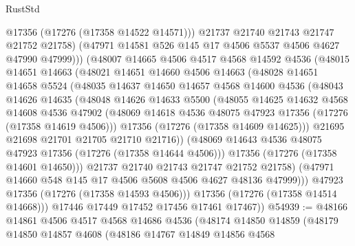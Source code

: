 \begin{lexlean}{RustStd}
\begin{coremodule}
                  @17356
                  (@17276 (@17358 @14522 @14571)))
                @21737
                @21740
                @21743
                @21747
                @21752
                @21758)
              (@47971 @14581 @526 @145 @17 @4506 @5537 @4506 @4627 @47990 @47999)))
          (@48007
            @14665
            @4506
            @4517
            @4568
            @14592
            @4536
            (@48015
              @14651
              @14663
              (@48021
                @14651
                @14660
                @4506
                @14663
                (@48028
                  @14651
                  @14658
                  @5524
                  (@48035
                    @14637
                    @14650
                    @14657
                    @4568
                    @14600
                    @4536
                    (@48043
                      @14626
                      @14635
                      (@48048
                        @14626
                        @14633
                        @5500
                        (@48055
                          @14625
                          @14632
                          @4568
                          @14608
                          @4536
                          @47902
                          (@48069 @14618 @4536 @48075 @47923 @17356 (@17276 (@17358 @14619 @4506)))
                          @17356
                          (@17276 (@17358 @14609 @14625)))
                        @21695
                        @21698
                        @21701
                        @21705
                        @21710
                        @21716))
                    (@48069 @14643 @4536 @48075 @47923 @17356 (@17276 (@17358 @14644 @4506)))
                    @17356
                    (@17276 (@17358 @14601 @14650)))
                  @21737
                  @21740
                  @21743
                  @21747
                  @21752
                  @21758)
                (@47971 @14660 @548 @145 @17 @4506 @5608 @4506 @4627 @48136 @47999)))
            @47923
            @17356
            (@17276 (@17358 @14593 @4506)))
          @17356
          (@17276 (@17358 @14514 @14668)))
        @17446
        @17449
        @17452
        @17456
        @17461
        @17467))
@54939 := @48166
    @14861
    @4506
    @4517
    @4568
    @14686
    @4536
    (@48174
      @14850
      @14859
      (@48179
        @14850
        @14857
        @4608
        (@48186
          @14767
          @14849
          @14856
          @4568

\end{coremodule}
\end{lexlean}
